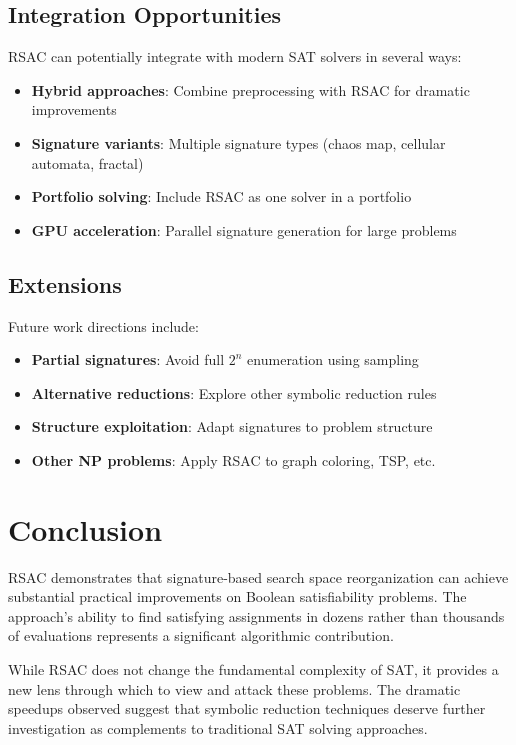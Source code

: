 \documentclass[conference]{IEEEtran}
\begin{document}
\subsection{Integration Opportunities}

RSAC can potentially integrate with modern SAT solvers in several ways:
\begin{itemize}
\item \textbf{Hybrid approaches}: Combine preprocessing with RSAC for dramatic improvements
\item \textbf{Signature variants}: Multiple signature types (chaos map, cellular automata, fractal)
\item \textbf{Portfolio solving}: Include RSAC as one solver in a portfolio
\item \textbf{GPU acceleration}: Parallel signature generation for large problems
\end{itemize}

\subsection{Extensions}

Future work directions include:
\begin{itemize}
\item \textbf{Partial signatures}: Avoid full $2^n$ enumeration using sampling
\item \textbf{Alternative reductions}: Explore other symbolic reduction rules
\item \textbf{Structure exploitation}: Adapt signatures to problem structure
\item \textbf{Other NP problems}: Apply RSAC to graph coloring, TSP, etc.
\end{itemize}

\section{Conclusion}

RSAC demonstrates that signature-based search space reorganization can achieve substantial practical improvements on Boolean satisfiability problems. The approach's ability to find satisfying assignments in dozens rather than thousands of evaluations represents a significant algorithmic contribution.

While RSAC does not change the fundamental complexity of SAT, it provides a new lens through which to view and attack these problems. The dramatic speedups observed suggest that symbolic reduction techniques deserve further investigation as complements to traditional SAT solving approaches.
\end{document}
